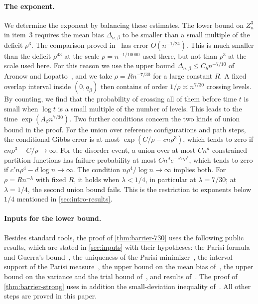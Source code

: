 \paragraph{The exponent.}
We determine the exponent by balancing these estimates. The lower
bound on $Z_n^3$ in item~3 requires the mean bias $\Delta_{n,\beta}$ to be
smaller than a small multiple of the deficit $\rho^3$. The comparison proved
in~\cite[Theorem~2.4]{oai-barriers} has error $O(n^{-1/24})$. This is much
smaller than the deficit $\rho^{43}$ at the scale $\rho=n^{-1/10000}$ used
there, but not than $\rho^3$ at the scale used here. For this reason we use
the upper bound $\Delta_{n,\beta}\le C_b n^{-7/10}$ of Aronow and
Lopatto~\cite{hexagon-bias}, and we take $\rho=Rn^{-7/30}$ for a large
constant $R$. A fixed overlap interval inside $(0,q_\beta)$ then contains
of order $1/\rho\asymp n^{7/30}$ crossing levels. By counting, we find
that the probability of crossing all of them before time $t$ is small
when $\log t$ is a small multiple of the number of levels. This leads to the
time $\exp(A_\beta n^{7/30})$. Two further conditions concern the two kinds
of union bound in the proof. For the union over reference configurations and
path steps, the conditional Gibbs error is at most $\exp(C/\rho-cn\rho^3)$,
which tends to zero if $cn\rho^3-C/\rho\to\infty$. For the disorder event,
a union over at most $Cn^d$ constrained partition functions has failure
probability at most $Cn^de^{-c'n\rho^4}$, which tends to zero if
$c'n\rho^4-d\log n\to\infty$. The
condition $n\rho^4/\log n\to\infty$ implies both. For $\rho=Rn^{-\lambda}$
with fixed $R$, it holds when $\lambda<1/4$, in particular at
$\lambda=7/30$; at $\lambda=1/4$, the second union bound fails. This is the
restriction to exponents below $1/4$ mentioned in \cref{sec:intro-results}.

\paragraph{Inputs for the lower bound.}
Besides standard tools, the proof of \cref{thm:barrier-730} uses the following
public results, which are stated in \cref{sec:inputs} with their hypotheses:
the Parisi formula and Guerra's bound~\cite{guerra-2003,parisi-formula}, the
uniqueness of the Parisi minimizer~\cite{auffinger-chen-uniqueness-2015}, the
interval support of the Parisi measure~\cite{full-rsb}, the upper bound on
the mean bias of~\cite[Theorem~1.1]{hexagon-bias}, the upper bound on the
variance and the trial bound of~\cite{quantitative-parisi}, and results
of~\cite[Sections~2--8]{oai-barriers}. The proof of
\cref{thm:barrier-strong} uses in addition the small-deviation inequality
of~\cite{paouris-valettas-2018}. All other steps are proved in this paper.

